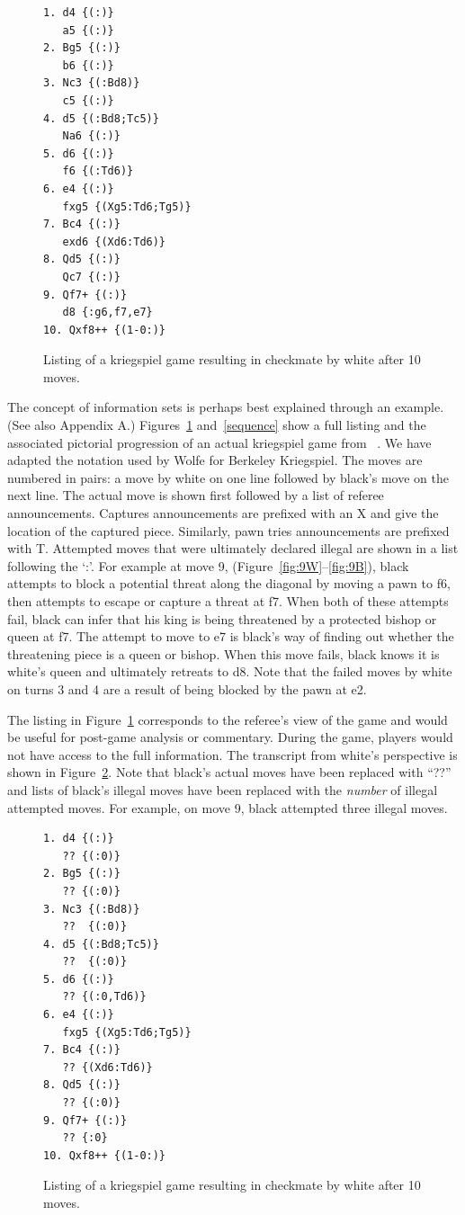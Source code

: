 \documentclass[conference]{IEEEtran}
\begin{document}
\begin{figure}
\begin{verbatim}
1. d4 {(:)}
   a5 {(:)}
2. Bg5 {(:)}
   b6 {(:)}
3. Nc3 {(:Bd8)}
   c5 {(:)}
4. d5 {(:Bd8;Tc5)}
   Na6 {(:)}
5. d6 {(:)}
   f6 {(:Td6)}
6. e4 {(:)}
   fxg5 {(Xg5:Td6;Tg5)}
7. Bc4 {(:)}
   exd6 {(Xd6:Td6)}
8. Qd5 {(:)}
   Qc7 {(:)}
9. Qf7+ {(:)} 
   d8 {:g6,f7,e7}
10. Qxf8++ {(1-0:)}
\end{verbatim}
\caption{Listing of a kriegspiel game resulting in checkmate by white after 10 moves.}
\label{listing}
\end{figure}

The concept of information sets is perhaps best explained through an example.  (See also Appendix A.)
Figures~\ref{listing} and~\ref{sequence} show a full listing and the associated pictorial progression of an actual
kriegspiel game from ~\cite{li94chess}.  We have adapted the notation used by Wolfe for Berkeley Kriegspiel.  The moves
are numbered in pairs: a move by white on one line followed by black's move on the next line.  The actual move is shown
first followed by a list of referee announcements.  Captures announcements are prefixed with an X and give the location
of the captured piece.  Similarly, pawn tries announcements are prefixed with T.  Attempted moves that were ultimately
declared illegal are shown in a list following the `:'.  For example at move 9, (Figure~\ref{fig:9W}--\ref{fig:9B}),
black attempts to block a potential threat along the diagonal by moving a pawn to f6, then attempts to escape or capture
a threat at f7.  When both of these attempts fail, black can infer that his king is being threatened by a protected
bishop or queen at f7.  The attempt to move to e7 is black's way of finding out whether the threatening piece is a queen
or bishop.  When this move fails, black knows it is white's queen and ultimately retreats to d8.  Note that the failed
moves by white on turns 3 and 4 are a result of being blocked by the pawn at e2.


The listing in Figure~\ref{listing} corresponds to the referee's view of the game and would be useful for
post-game analysis or commentary.  During the game, players would not have access to the full information.  The
transcript from white's perspective is shown in Figure~\ref{filteredlisting}.  Note that black's actual moves have been
replaced with ``??'' and lists of black's illegal moves have been replaced with the {\em number} of illegal attempted
moves.  For example, on move 9, black attempted three illegal moves.
\begin{figure}
\begin{verbatim}
1. d4 {(:)}
   ?? {(:0)}
2. Bg5 {(:)}
   ?? {(:0)}
3. Nc3 {(:Bd8)}
   ??  {(:0)}
4. d5 {(:Bd8;Tc5)}
   ??  {(:0)}
5. d6 {(:)}
   ?? {(:0,Td6)}
6. e4 {(:)}
   fxg5 {(Xg5:Td6;Tg5)}
7. Bc4 {(:)}
   ?? {(Xd6:Td6)}
8. Qd5 {(:)}
   ?? {(:0)}
9. Qf7+ {(:)} 
   ?? {:0}
10. Qxf8++ {(1-0:)}
\end{verbatim}
\caption{Listing of a kriegspiel game resulting in checkmate by white after 10 moves.}
\label{filteredlisting}
\end{figure}
\end{document}
